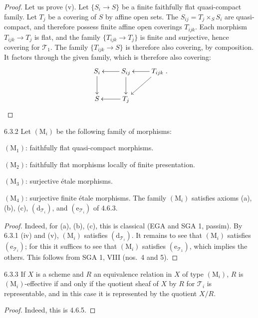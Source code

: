 \begin{proof}
Let us prove (v). Let \(\{S_i\to S\}\) be a finite
faithfully flat quasi-compact family.
Let \(T_j\) be a covering of \(S\) by affine open sets.
The \(S_{ij}=T_j\times_S S_i\) are quasi-compact,
and therefore possess finite affine open coverings
\(T_{ijk}\). Each morphism \(T_{ijk}\to T_j\) is
flat, and the family \(\{T_{ijk}\to T_j\}\) is
finite and surjective, hence covering for \(\mathcal T_1\).
The family \(\{T_{ijk}\to S\}\) is therefore also
covering, by composition.
It factors through the given family, which is
therefore also covering:
\[
\xymatrix{
S_i\ar[d] & S_{ij}\ar[l]\ar[d] & T_{ijk}\ar[l]\ar[dl]\\
S & T_j\ar[l] & }.
\]
\end{proof}

\begin{corollary}{6.3.2}\label{IV.6.3.2}
Let \((\mathrm M_i)\) be the following family of morphisms:

\((\mathrm M_1)\): faithfully flat quasi-compact morphisms.

\((\mathrm M_2)\): faithfully flat morphisms locally of finite presentation.

\((\mathrm M_3)\): surjective étale morphisms.

\((\mathrm M_4)\): surjective finite étale morphisms.
The family \((\mathrm M_i)\) satisfies axioms (a),
(b), (c), \((\mathrm d_{\mathcal T_i})\), and
\((\mathrm e_{\mathcal T_i})\) of 4.6.3.
\end{corollary}
\begin{proof}
Indeed, for (a), (b), (c), this is classical
(EGA and SGA 1, passim).
By 6.3.1 (iv) and (v), \((\mathrm M_i)\) satisfies
\((\mathrm d_{\mathcal T_i})\).
It remains to see that \((\mathrm M_i)\)
satisfies \((\mathrm e_{\mathcal T_i})\);
for this it suffices to see that \((\mathrm M_i)\)
satisfies \((\mathrm e_{\mathcal T_1})\), which
implies the others. This follows from SGA 1,
VIII (nos.\ 4 and 5).
\end{proof}
\begin{corollary}{6.3.3}\label{IV.6.3.3}
If \(X\) is a scheme and \(R\) an equivalence
relation in \(X\) of type \((\mathrm M_i)\),
\(R\) is \((\mathrm M_i)\)-effective if and
only if the quotient sheaf of \(X\) by \(R\)
for \(\mathcal T_i\) is representable, and
in this case it is represented by the quotient \(X/R\).
\end{corollary}
\begin{proof}
Indeed, this is 4.6.5.
\end{proof}

